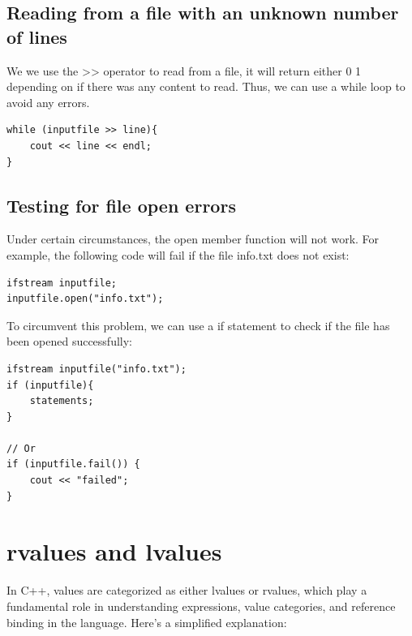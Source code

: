 \documentclass{report}
\begin{document}
    \subsection{Reading from a file with an unknown number of lines}
    \bigbreak \noindent 
    We we use the >> operator to read from a file, it will return either 0 1 depending on if there was any content to read. Thus, we can use a while loop to avoid any errors.
    \bigbreak \noindent 
    \sepline
    \begin{verbatim}
while (inputfile >> line){
    cout << line << endl;
}
    \end{verbatim}
    \sepline

    \bigbreak \noindent 
    \subsection{Testing for file open errors}
    \bigbreak \noindent 
    Under certain circumstances, the open member function will not work. For example, the following code will fail if the file info.txt does not exist:
    \bigbreak \noindent 
    \sepline
    \begin{verbatim}
ifstream inputfile;
inputfile.open("info.txt");
    \end{verbatim}
    \sepline
    \bigbreak \noindent 
    To circumvent this problem, we can use a if statement to check if the file has been opened successfully:
    \bigbreak \noindent 
    \sepline
    \begin{verbatim}
ifstream inputfile("info.txt");
if (inputfile){
    statements;
}

// Or
if (inputfile.fail()) {
    cout << "failed";
}
    \end{verbatim}
    \sepline

    \pagebreak \bigbreak \noindent 
    \section{\LARGE rvalues and lvalues}
    \bigbreak \noindent 
    In C++, values are categorized as either lvalues or rvalues, which play a fundamental role in understanding expressions, value categories, and reference binding in the language.
    \bigbreak \noindent 
    Here's a simplified explanation:

    \bigbreak \noindent 
\end{document}
